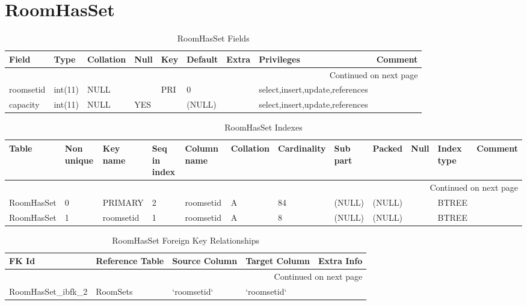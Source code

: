 \documentclass[tablesignature,landscape]{scrartcl}
\begin{document}
\section{RoomHasSet}
\label{sec-21}


\begin{longtable}{|l|l|l|l|l|l|l|l|l|}
\caption{RoomHasSet Fields} \label{tbl:roomhassetfields}\\
\hline
 Field      &  Type     &  Collation  &  Null  &  Key  &  Default  &  Extra  &  Privileges                       &  Comment \\
\hline
\endhead
\hline\multicolumn{9}{r}{Continued on next page}\
\endfoot
\endlastfoot
\hline
 roomid     &  int(11)  &  NULL       &        &  PRI  &        0  &         &  select,insert,update,references  &           \\
 roomsetid  &  int(11)  &  NULL       &        &  PRI  &        0  &         &  select,insert,update,references  &           \\
 capacity   &  int(11)  &  NULL       &  YES   &       &   (NULL)  &         &  select,insert,update,references  &           \\
\hline
\end{longtable}


\begin{longtable}{|l|l|l|l|l|l|l|l|l|l|l|l|}
\caption{RoomHasSet Indexes} \label{tbl:roomhassetindexes}\\
\hline
 Table       &  Non unique  &  Key name   &  Seq in index  &  Column name  &  Collation  &  Cardinality  &  Sub part  &  Packed  &  Null  &  Index type  &  Comment \\
\hline
\endhead
\hline\multicolumn{12}{r}{Continued on next page}\
\endfoot
\endlastfoot
\hline
 RoomHasSet  &           0  &  PRIMARY    &             1  &  roomid       &  A          &           84  &  (NULL)    &  (NULL)  &        &  BTREE       &           \\
 RoomHasSet  &           0  &  PRIMARY    &             2  &  roomsetid    &  A          &           84  &  (NULL)    &  (NULL)  &        &  BTREE       &           \\
 RoomHasSet  &           1  &  roomsetid  &             1  &  roomsetid    &  A          &            8  &  (NULL)    &  (NULL)  &        &  BTREE       &           \\
\hline
\end{longtable}


\begin{longtable}{|l|l|l|l|l|}
\caption{RoomHasSet Foreign Key Relationships} \label{tbl:roomhassetfkr}\\
\hline
 FK Id                    &  Reference Table  &  Source Column  &  Target Column  &  Extra Info \\
\hline
\endhead
\hline\multicolumn{5}{r}{Continued on next page}\
\endfoot
\endlastfoot
\hline
 RoomHasSet\_{}ibfk\_{}1  &  Rooms            &  `roomid`       &  `roomid`       &              \\
 RoomHasSet\_{}ibfk\_{}2  &  RoomSets         &  `roomsetid`    &  `roomsetid`    &              \\
\hline
\end{longtable}
\end{document}
